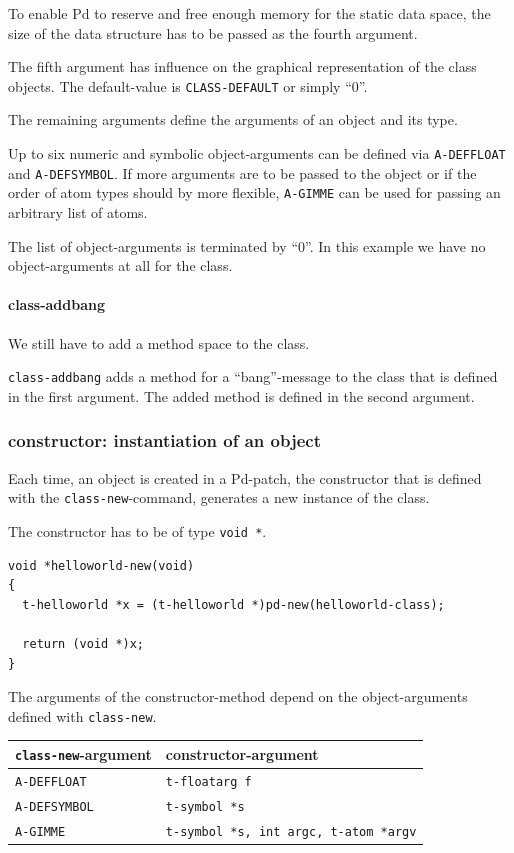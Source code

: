 \documentclass{ppgmus}
\begin{document}
To enable Pd to reserve and free enough memory for the static data space,
the size of the data structure has to be passed as the fourth argument.

The fifth argument has influence on the graphical representation of the class objects.
The default-value is \verb+CLASS-DEFAULT+ or simply ``0''.

The remaining arguments define the arguments of an object and its type.

Up to six numeric and symbolic object-arguments can be defined via
\verb+A-DEFFLOAT+ and \verb+A-DEFSYMBOL+.
If more arguments are to be passed to the object
or if the order of atom types should by more flexible, 
\verb+A-GIMME+ can be used for passing an arbitrary list of atoms.

The list of object-arguments is terminated by ``0''.
In this example we have no object-arguments at all for the class.

\paragraph{class-addbang}
We still have to add a method space to the class.

\verb+class-addbang+ adds a method for a ``bang''-message to the class that is
defined in the first argument.
The added method is defined in the second argument.


\subsubsection{constructor: instantiation of an object}
Each time, an object is created in a Pd-patch, the
constructor that is defined with the \verb+class-new+-command,
generates a new instance of the class.

The constructor has to be of type \verb+void *+.

\begin{verbatim}
void *helloworld-new(void)
{
  t-helloworld *x = (t-helloworld *)pd-new(helloworld-class);

  return (void *)x;
}
\end{verbatim}


The arguments of the constructor-method depend on the object-arguments
defined with \verb+class-new+.

\begin{tabular}{l|l}
\verb+class-new+-argument&constructor-argument\\
\hline
\verb+A-DEFFLOAT+&\verb+t-floatarg f+ \\
\verb+A-DEFSYMBOL+&\verb+t-symbol *s+ \\
\verb+A-GIMME+&\verb+t-symbol *s, int argc, t-atom *argv+
\end{tabular}
\end{document}
